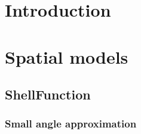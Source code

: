 \documentclass{article}[12pt,a4]
\begin{document}
\frontpage


\section{Introduction}


\section{Spatial models}

\subsection{ShellFunction}

\subsubsection{Small angle approximation}
\end{document}
